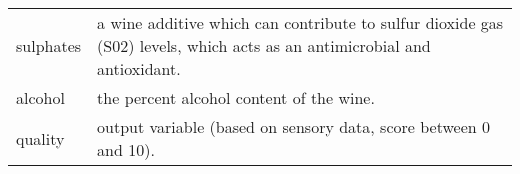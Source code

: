 \begin{tabular}{ll}
           sulphates &                                                                         a wine additive which can contribute to sulfur dioxide gas (S02) levels, which acts as an antimicrobial and antioxidant. \\
             alcohol &                                                                                                                                                         the percent alcohol content of the wine. \\
             quality &                                                                                                                                 output variable (based on sensory data, score between 0 and 10). \\
\bottomrule
\end{tabular}

